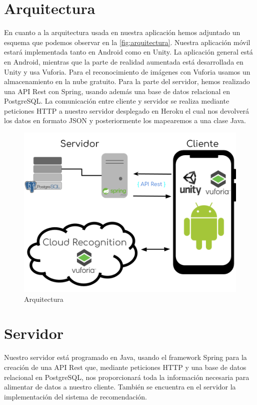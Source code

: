 \section{Arquitectura}
\label{makereference4.2}
En cuanto a la arquitectura usada en nuestra aplicación hemos adjuntado un esquema que podemos observar en la \autoref{fig:arquitectura}. Nuestra aplicación móvil estará implementada tanto en Android
como en Unity. La aplicación general está en Android, mientras que la parte de realidad aumentada está desarrollada en Unity y usa Vuforia. Para el reconocimiento
de imágenes con Vuforia usamos un almacenamiento en la nube gratuito.
Para la parte del servidor, hemos realizado una API Rest con Spring, usando además una base de datos relacional en PostgreSQL. La comunicación entre cliente y servidor se realiza mediante peticiones HTTP a 
nuestro servidor desplegado en Heroku el cual nos devolverá los datos en formato JSON y posteriormente los mapearemos a una clase Java.
\begin{figure}[H]
    \centering
    \includegraphics[width=6in]{figures/chapter-4/arquitectura.png}
    \caption{Arquitectura}
    \label{fig:arquitectura}
\end{figure}
\section{Servidor}
\label{makereference4.3}
Nuestro servidor está programado en Java, usando el framework Spring para la
 creación de una API Rest que, mediante peticiones HTTP y una base de datos
 relacional en PostgreSQL, nos proporcionará toda la información necesaria
 para alimentar de datos a nuestro cliente.
También se encuentra en el servidor la implementación del sistema de
 recomendación.

